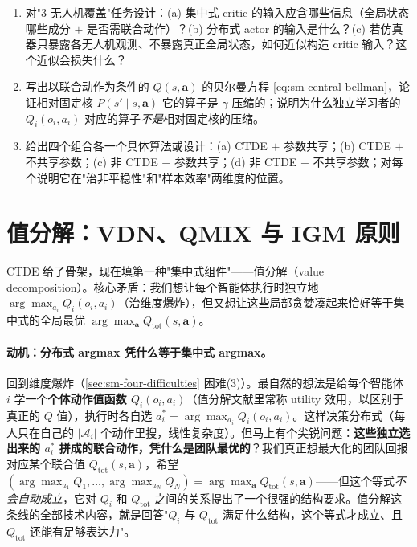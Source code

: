 \begin{practice}
\begin{enumerate}
  \item 对"3 无人机覆盖"任务设计：(a) 集中式 critic 的输入应含哪些信息（全局状态哪些成分 $+$ 是否需联合动作）？(b) 分布式 actor 的输入是什么？(c) 若仿真器只暴露各无人机观测、不暴露真正全局状态，如何近似构造 critic 输入？这个近似会损失什么？
  \item 写出以联合动作为条件的 $Q(s,\mathbf{a})$ 的贝尔曼方程 \cref{eq:sm-central-bellman}，论证相对固定核 $P(s'\mid s,\mathbf{a})$ 它的算子是 $\gamma$-压缩的；说明为什么独立学习者的 $Q_i(o_i,a_i)$ 对应的算子\emph{不是}相对固定核的压缩。
  \item 给出四个组合各一个具体算法或设计：(a) CTDE $+$ 参数共享；(b) CTDE $+$ 不共享参数；(c) 非 CTDE $+$ 参数共享；(d) 非 CTDE $+$ 不共享参数；对每个说明它在"治非平稳性"和"样本效率"两维度的位置。
\end{enumerate}
\end{practice}

\section{值分解：VDN、QMIX 与 IGM 原则}
\label{sec:sm-valuedecomp}

CTDE 给了骨架，现在填第一种"集中式组件"——值分解（value decomposition）。核心矛盾：我们想让每个智能体执行时独立地 $\arg\max_{a_i}Q_i(o_i,a_i)$（治维度爆炸），但又想让这些局部贪婪凑起来恰好等于集中式的全局最优 $\arg\max_{\mathbf{a}}Q_{\text{tot}}(s,\mathbf{a})$。

\paragraph{动机：分布式 argmax 凭什么等于集中式 argmax。}
回到维度爆炸（\cref{sec:sm-four-difficulties} 困难(3)）。最自然的想法是给每个智能体 $i$ 学一个\textbf{个体动作值函数 $Q_i(o_i,a_i)$}（值分解文献里常称 utility 效用，以区别于真正的 $Q$ 值），执行时各自选 $a_i^*=\arg\max_{a_i}Q_i(o_i,a_i)$。这样决策分布式（每人只在自己的 $|\mathcal{A}_i|$ 个动作里搜，线性复杂度）。但马上有个尖锐问题：\textbf{这些独立选出来的 $a_i^*$ 拼成的联合动作，凭什么是团队最优的}？我们真正想最大化的团队回报对应某个联合值 $Q_{\text{tot}}(s,\mathbf{a})$，希望 $(\arg\max_{a_1}Q_1,\dots,\arg\max_{a_N}Q_N)=\arg\max_{\mathbf{a}}Q_{\text{tot}}(s,\mathbf{a})$——但这个等式\emph{不会自动成立}，它对 $Q_i$ 和 $Q_{\text{tot}}$ 之间的关系提出了一个很强的结构要求。值分解这条线的全部技术内容，就是回答"$Q_i$ 与 $Q_{\text{tot}}$ 满足什么结构，这个等式才成立、且 $Q_{\text{tot}}$ 还能有足够表达力"。

